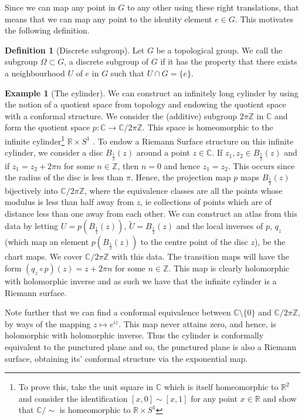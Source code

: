 \documentclass[11pt]{report}
\theoremstyle{definition}
\newtheorem{defn}[thm]{Definition}
\newtheorem{example}[thm]{Example}
\begin{document}
Since we can map any point in $G$ to any other using these right translations, that means that we can map any point to the identity element $e \in G$. This motivates the following definition.
\begin{defn}[Discrete subgroup]
  Let $G$ be a topological group. We call the subgroup $\Omega \subset G$, a discrete subgroup of $G$ if it has the property that there exists a neighbourhood $U$ of $e$ in $G$ such that $U \cap G = \{e\}$.
\end{defn}
\begin{example}[The cylinder]
We can construct an infinitely long cylinder by using the notion of a quotient space from topology and endowing the quotient space with a conformal structure. We consider the (additive) subgroup $2\pi \mathbb{Z}$ in $\mathbb{C}$ and form the quotient space $p \colon \mathbb{C} \rightarrow \mathbb{C}/2\pi \mathbb{Z}$. This space is homeomorphic to the infinite cylinder\footnote{To prove this, take the unit square in $\mathbb{C}$ which is itself homeomorphic to $\mathbb{R}^2$ and consider the identification $[x,0] \sim [x,1]$ for any point $x \in \mathbb{R}$ and show that $\mathbb{C}/\sim$ is homeomorphic to $\mathbb{R}\times S^1$} $\mathbb{R} \times S^1$ . To endow a Riemann Surface structure on this infinite cylinder, we consider a disc $B_{\frac{1}{2}}(z)$ around a point $z \in \mathbb{C}$. If $z_1, z_2 \in B_{\frac{1}{2}}(z)$ and if $z_1 = z_2 + 2\pi n$ for some $n \in \mathbb{Z}$, then $n=0$ and hence $z_1=z_2$. This occurs since the radius of the disc is less than $\pi$. Hence, the projection map $p$ maps $B_{\frac{1}{2}}(z)$ bijectively into $\mathbb{C}/2\pi\mathbb{Z}$, where the equivalence classes are all the points whose modulus is less than half away from $z$, ie collections of points which are of distance less than one away from each other. We can construct an atlas from this data by letting $U = p(B_{\frac{1}{2}}(z))$, $\tilde{U} = B_{\frac{1}{2}}(z)$ and the local inverses of $p$, $q_z$ (which map an element $p(B_{\frac{1}{2}}(z))$ to the centre point of the disc $z$), be the chart maps. We cover $\mathbb{C}/2\pi\mathbb{Z}$ with this data. The transition maps will have the form $(q_z \circ p)(z) = z + 2\pi n$ for some $n \in \mathbb{Z}$. This map is clearly holomorphic with holomorphic inverse and as such we have that the infinite cylinder is a Riemann surface. 

Note further that we can find a conformal equivalence between $\mathbb{C}\setminus \{0\}$ and $\mathbb{C}/2\pi\mathbb{Z}$, by ways of the mapping $z \mapsto e^{iz}$. This map never attains zero, and hence, is holomorphic with holomorphic inverse. Thus the cylinder is conformally equivalent to the punctured plane and so, the punctured plane is also a Riemann surface, obtaining its' conformal structure via the exponential map. 
\end{example}
 
\end{document}
